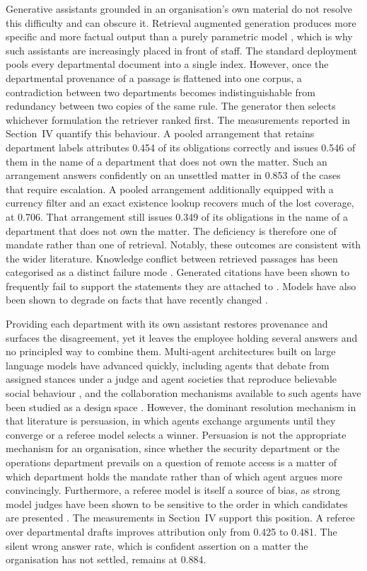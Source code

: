 \documentclass[journal]{IEEEtran}
\begin{document}
Generative assistants grounded in an organisation's own material do not resolve this difficulty and can obscure it. Retrieval augmented generation produces more specific and more factual output than a purely parametric model \cite{huang2026ragsurvey}, which is why such assistants are increasingly placed in front of staff. The standard deployment pools every departmental document into a single index. However, once the departmental provenance of a passage is flattened into one corpus, a contradiction between two departments becomes indistinguishable from redundancy between two copies of the same rule. The generator then selects whichever formulation the retriever ranked first. The measurements reported in Section~IV quantify this behaviour. A pooled arrangement that retains department labels attributes 0.454 of its obligations correctly and issues 0.546 of them in the name of a department that does not own the matter. Such an arrangement answers confidently on an unsettled matter in 0.853 of the cases that require escalation. A pooled arrangement additionally equipped with a currency filter and an exact existence lookup recovers much of the lost coverage, at 0.706. That arrangement still issues 0.349 of its obligations in the name of a department that does not own the matter. The deficiency is therefore one of mandate rather than one of retrieval. Notably, these outcomes are consistent with the wider literature. Knowledge conflict between retrieved passages has been categorised as a distinct failure mode \cite{xu2024conflicts}. Generated citations have been shown to frequently fail to support the statements they are attached to \cite{gao2023citations}. Models have also been shown to degrade on facts that have recently changed \cite{vu2024freshllms}.

Providing each department with its own assistant restores provenance and surfaces the disagreement, yet it leaves the employee holding several answers and no principled way to combine them. Multi-agent architectures built on large language models have advanced quickly, including agents that debate from assigned stances under a judge \cite{liang2024debate} and agent societies that reproduce believable social behaviour \cite{park2023generative}, and the collaboration mechanisms available to such agents have been studied as a design space \cite{zhang2024collaboration}. However, the dominant resolution mechanism in that literature is persuasion, in which agents exchange arguments until they converge or a referee model selects a winner. Persuasion is not the appropriate mechanism for an organisation, since whether the security department or the operations department prevails on a question of remote access is a matter of which department holds the mandate rather than of which agent argues more convincingly. Furthermore, a referee model is itself a source of bias, as strong model judges have been shown to be sensitive to the order in which candidates are presented \cite{wang2024unfair}. The measurements in Section~IV support this position. A referee over departmental drafts improves attribution only from 0.425 to 0.481. The silent wrong answer rate, which is confident assertion on a matter the organisation has not settled, remains at 0.884.
\end{document}

